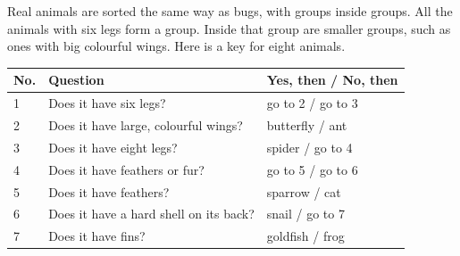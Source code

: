 \label{ch5}

Real animals are sorted the same way as bugs, with groups inside groups. All the animals with six legs form a group. Inside that group are smaller groups, such as ones with big colourful wings. Here is a key for eight animals.

\begin{center}
\sffamily\small\renewcommand{\arraystretch}{1.5}
\begin{tabular}{@{}p{0.6cm}p{6.6cm}p{2.9cm}@{}}
\toprule
\textbf{No.} & \textbf{Question} & \textbf{Yes, then / No, then}\\
\midrule
1 & Does it have six legs? & go to 2 / go to 3\\
2 & Does it have large, colourful wings? & butterfly / ant\\
3 & Does it have eight legs? & spider / go to 4\\
4 & Does it have feathers or fur? & go to 5 / go to 6\\
5 & Does it have feathers? & sparrow / cat\\
6 & Does it have a hard shell on its back? & snail / go to 7\\
7 & Does it have fins? & goldfish / frog\\
\bottomrule
\end{tabular}
\end{center}

\begin{center}
\end{center}

